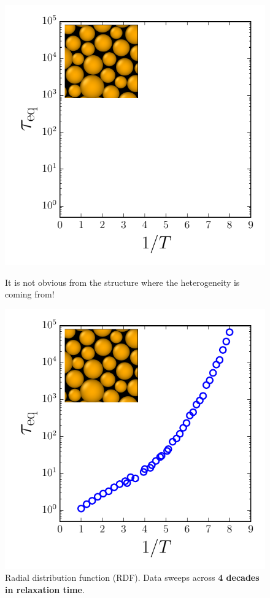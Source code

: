 \begin{frame}[c]
\begin{columns}
\begin{column}{0.5\textwidth}
\begin{figure}[t]
\begin{overprint}
\centering\includegraphics[height=0.6\textheight]{intro_glassy/timerelax_poly12_0.pdf}\caption{It is not obvious from the structure where the heterogeneity is coming from!}
\centering\includegraphics[height=0.6\textheight]{intro_glassy/timerelax_poly12_1.pdf}
\caption{Radial distribution function (RDF). Data sweeps across \textbf{4 decades in relaxation time}.}


\end{overprint}
\end{figure}
\end{column}
\end{columns}
\end{frame}
